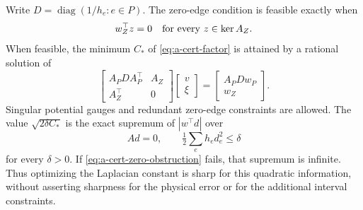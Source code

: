 \begin{proposition}
\label{prop:a-cert-projection}
Write $D=\operatorname{diag}(1/h_e:e\in P)$. The zero-edge
condition is feasible exactly when
\begin{equation}
 w_Z^\top z=0\quad\hbox{for every }z\in\ker A_Z.
 \label{eq:a-cert-zero-obstruction}
\end{equation}
When feasible, the minimum $C_*$ of \eqref{eq:a-cert-factor} is
attained by a rational solution of
\begin{equation}
 \begin{bmatrix}A_PD A_P^\top&A_Z\\ A_Z^\top&0\end{bmatrix}
 \begin{bmatrix}v\\\xi\end{bmatrix}
 =\begin{bmatrix}A_PD w_P\\w_Z\end{bmatrix}.
 \label{eq:a-cert-kkt}
\end{equation}
Singular potential gauges and redundant zero-edge constraints are
allowed. The value $\sqrt{2\delta C_*}$ is the exact supremum of
$|w^\top d|$ over
\begin{equation}
 Ad=0,\qquad \tfrac12\sum_e h_ed_e^2\le\delta
 \label{eq:a-cert-error-set}
\end{equation}
for every $\delta>0$. If \eqref{eq:a-cert-zero-obstruction} fails,
that supremum is infinite. Thus optimizing the Laplacian constant is
sharp for this quadratic information, without asserting sharpness for
the physical error or for the additional interval constraints.
\end{proposition}
